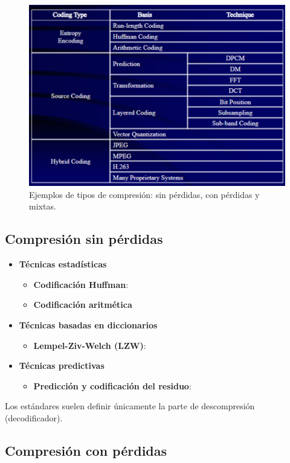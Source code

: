 \documentclass[11pt,a4paper]{article}
\begin{document}
\begin{figure}[!htbp]
	\centering
	\includegraphics[width=0.8\linewidth]{resources/Compression_Types_Examples}
	\caption{Ejemplos de tipos de compresión: sin pérdidas, con pérdidas y mixtas.}
	\label{fig:compression-types-examples}
\end{figure}

\subsection{Compresión sin pérdidas}
\begin{itemize}
	\item \textbf{Técnicas estadísticas}
	\begin{itemize}
		\item \textbf{Codificación Huffman}:
		\item \textbf{Codificación aritmética}
	\end{itemize}
	\item \textbf{Técnicas basadas en diccionarios}
	\begin{itemize}
		\item \textbf{Lempel-Ziv-Welch (LZW)}:
	\end{itemize}
	\item \textbf{Técnicas predictivas}
	\begin{itemize}
		\item \textbf{Predicción y codificación del residuo}:
	\end{itemize}
\end{itemize}

\begin{NotaBox}
Los estándares suelen definir únicamente la parte de descompresión (decodificador).
\end{NotaBox}

\subsection{Compresión con pérdidas}
\end{document}
